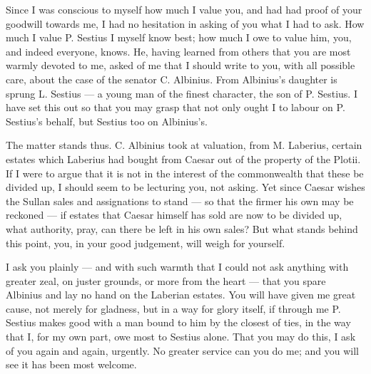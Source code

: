 

 Since I was conscious to myself how much I value you, and had had proof of your goodwill towards me, I had no hesitation in asking of you what I had to ask. How much I value P. Sestius I myself know best; how much I owe to value him, you, and indeed everyone, knows. He, having learned from others that you are most warmly devoted to me, asked of me that I should write to you, with all possible care, about the case of the senator C. Albinius. From Albinius's daughter is sprung L. Sestius --- a young man of the finest character, the son of P. Sestius. I have set this out so that you may grasp that not only ought I to labour on P. Sestius's behalf, but Sestius too on Albinius's.

 The matter stands thus. C. Albinius took at valuation, from M. Laberius, certain estates which Laberius had bought from Caesar out of the property of the Plotii. If I were to argue that it is not in the interest of the commonwealth that these be divided up, I should seem to be lecturing you, not asking. Yet since Caesar wishes the Sullan sales and assignations to stand --- so that the firmer his own may be reckoned --- if estates that Caesar himself has sold are now to be divided up, what authority, pray, can there be left in his own sales? But what stands behind this point, you, in your good judgement, will weigh for yourself.

 I ask you plainly --- and with such warmth that I could not ask anything with greater zeal, on juster grounds, or more from the heart --- that you spare Albinius and lay no hand on the Laberian estates. You will have given me great cause, not merely for gladness, but in a way for glory itself, if through me P. Sestius makes good with a man bound to him by the closest of ties, in the way that I, for my own part, owe most to Sestius alone. That you may do this, I ask of you again and again, urgently. No greater service can you do me; and you will see it has been most welcome.
